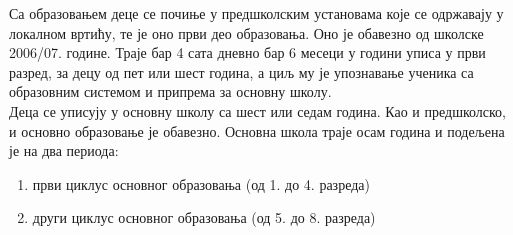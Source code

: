 \documentclass[12pt,twoside]{article}
\begin{document}
  Са образовањем деце се почиње у предшколским установама које се одржавају у локалном вртићу, те је оно први део образовања. Оно је обавезно од школске 2006/07. године. Траје бар 4 сата дневно бар 6 месеци у години уписа у први разред, за децу од пет или шест година, а циљ му је упознавање ученика са образовним системом и припрема за основну школу.\\
  Деца се уписују у основну школу са шест или седам година. Као и предшколско, и основно образовање је обавезно. Основна школа траје осам година и подељена је на два периода:
\begin{enumerate}
    \item први циклус основног образовања (од 1. до 4. разреда)
    \item други циклус основног образовања (од 5. до 8. разреда)
\end{enumerate}
\end{document}
